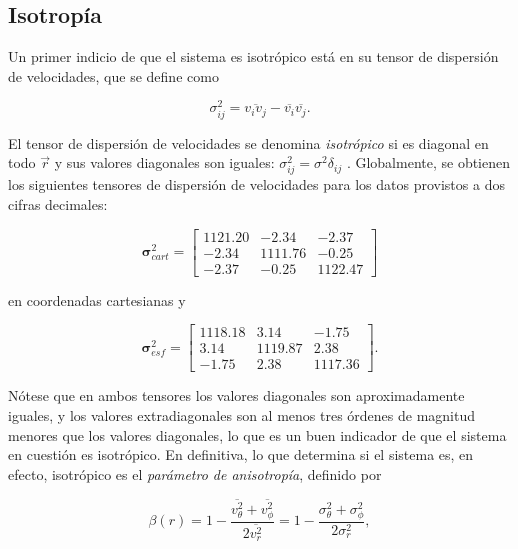 \documentclass[final,5p,times,twocolumn, nopreprintline]{elsarticle}
\numberwithin{equation}{section}
\begin{document}
\subsection{Isotropía}

Un primer indicio de que el sistema es isotrópico está en su tensor de dispersión de velocidades, que se define como 

\begin{equation}
\sigma^2_{ij}=\overline{v_iv_j}-\overline{v_i}\overline{v_j}. \label{eq:sigma2}
\end{equation}

El tensor de dispersión de velocidades se denomina \emph{isotrópico} si es diagonal en todo $\vec{r}$ y sus valores diagonales son iguales: $\sigma^2_{ij}=\sigma^2\delta_{ij}$ \cite{binney2011galactic}. Globalmente, se obtienen los siguientes tensores de dispersión de velocidades para los datos provistos a dos cifras decimales:

\begin{equation}
\boldsymbol{\sigma}^2_{cart}=\begin{bmatrix}
1121.20 & -2.34 & -2.37\\
-2.34 & 1111.76 & -0.25\\
-2.37 & -0.25 & 1122.47
\end{bmatrix}\label{eq:sigmacart}
\end{equation}

en coordenadas cartesianas y

\begin{equation}
\boldsymbol{\sigma}^2_{esf}=\begin{bmatrix}
1118.18 & 3.14 & -1.75\\
3.14 & 1119.87 & 2.38\\
-1.75 & 2.38 & 1117.36
\end{bmatrix}.\label{eq:sigmaesf}
\end{equation}

Nótese que en ambos tensores los valores diagonales son aproximadamente iguales, y los valores extradiagonales son al menos tres órdenes de magnitud menores que los valores diagonales, lo que es un buen indicador de que el sistema en cuestión es isotrópico. En definitiva, lo que determina si el sistema es, en efecto, isotrópico es el \emph{parámetro de anisotropía}, definido por

\begin{equation}
\beta(r)=1-\dfrac{\overline{v_\theta^2}+\overline{v_\phi^2}}{2\overline{v_r^2}}=1-\dfrac{\sigma_\theta^2+\sigma_\phi^2}{2\sigma_r^2}, \label{eq:beta}
\end{equation}
\end{document}
